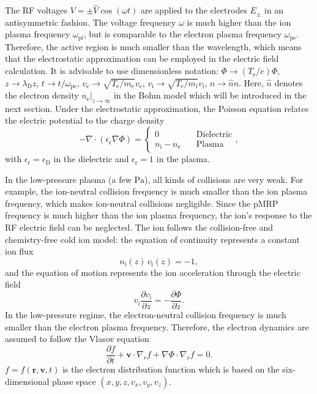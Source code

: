 \documentclass[superscriptaddress,preprint]{revtex4}  %
\renewcommand{\vec}{\mathbf}
\begin{document}
The RF voltages $V=\pm \hat{V} \cos(\omega t)$ are applied to the electrodes $E_\pm$ in an antisymmetric fashion. The voltage frequency $\omega$ is much higher than the ion plasma frequency $\omega_\mathrm{pi}$, but is comparable to the electron plasma frequency $\omega_\mathrm{pe}$. Therefore, the active region is much smaller than the wavelength, which means that the electrostatic approximation can be employed in the electric field calculation. It is advisable to use dimensionless notation: $\Phi \rightarrow (T_\mathrm{e}/e)\Phi$, $z \rightarrow \lambda_\mathrm{D}z$, $t \rightarrow t/\omega_\mathrm{pe}$, $v_\mathrm{e} \rightarrow \sqrt{T_\mathrm{e}/m_\mathrm{e}}v_\mathrm{e}$, $v_\mathrm{i} \rightarrow \sqrt{T_\mathrm{e}/m_\mathrm{i}}v_\mathrm{i}$, $n \rightarrow \hat{n} n$. Here, $\hat{n}$ denotes the electron density $n_\mathrm{e}|_{z \rightarrow \infty}$ in the Bohm model which will be introduced in the next section. Under the electrostatic approximation, the Poisson equation relates the electric potential to the charge density
\begin{equation}
-\nabla \cdot \left(\epsilon_\mathrm{r} \nabla \Phi \right)=
\begin{cases}
0                                  &\text{Dielectric} \\
n_\mathrm{i}-n_\mathrm{e}    \quad &\text{Plasma} 
\end{cases},
\label{potential-D&P}
\end{equation}
with $\epsilon_\mathrm{r}=\epsilon_\mathrm{D}$ in the dielectric and $\epsilon_\mathrm{r}=1$ in the plasma. 

In the low-pressure plasma (a few $\mathrm{Pa}$), all kinds of collisions are very weak. For example, the ion-neutral collision frequency is much smaller than the ion plasma frequency, which makes ion-neutral collisions negligible. Since the pMRP frequency is much higher than the ion plasma frequency, the ion's response to the RF electric field can be neglected. The ion follows the collision-free and chemistry-free cold ion model: the equation of continuity represents a constant ion flux
\begin{equation}
n_\mathrm{i}(z)\, v_\mathrm{i}(z)=-1, 
\label{ion continuity}
\end{equation}
and the equation of motion represents the ion acceleration through the electric field
\begin{equation}
v_\mathrm{i} \frac{\partial v_\mathrm{i}}{\partial z}=-\frac{\partial \Phi}{\partial z}. 
\label{ion motion} 
\end{equation}
In the low-pressure regime, the electron-neutral collision frequency is much smaller than the electron plasma frequency. Therefore, the electron dynamics are assumed to follow the Vlasov equation 
\begin{equation}
\frac{\partial f}{\partial t}+\vec{v} \cdot \nabla_r f+\nabla\Phi \cdot \nabla_v f=0.
\label{Vlasov}
\end{equation}
$f=f(\vec{r},\vec{v},t)$ is the electron distribution function which is based on the six-dimensional phase space $(x,y,z,v_x,v_y,v_z)$.
\end{document}
